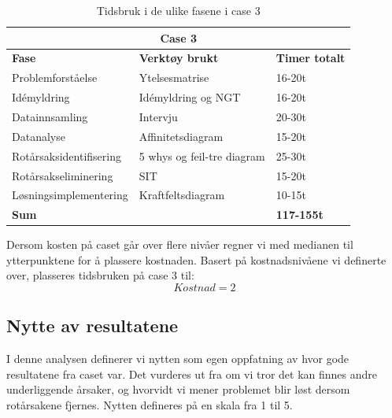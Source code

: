 \begin{table}[H]
  \centering
  \caption{Tidsbruk i de ulike fasene i case 3}
    \begin{tabular}{|lr|l|}
    \hline
    \multicolumn{3}{|c|}{\cellcolor{yellow}\textbf{Case 3}} \\
    \hline
    \multicolumn{1}{|l|}{\cellcolor{apricot}\textbf{Fase}} & \multicolumn{1}{l|}{\cellcolor{apricot}\textbf{Verktøy brukt}} & \cellcolor{apricot}\textbf{Timer totalt} \\
    \hline
    \multicolumn{1}{|l|}{Problemforståelse} & \multicolumn{1}{l|}{Ytelsesmatrise} & 16-20t \\
    \hline
    \multicolumn{1}{|l|}{Idémyldring} & \multicolumn{1}{l|}{Idémyldring og NGT} & 16-20t \\
    \hline
    \multicolumn{1}{|l|}{Datainnsamling} & \multicolumn{1}{l|}{Intervju} & 20-30t \\
    \hline
    \multicolumn{1}{|l|}{Datanalyse} & \multicolumn{1}{l|}{Affinitetsdiagram} & 15-20t \\
    \hline
    \multicolumn{1}{|l|}{Rotårsaksidentifisering} & \multicolumn{1}{l|}{5 whys og feil-tre diagram} & 25-30t \\
    \hline
    \multicolumn{1}{|l|}{Rotårsakseliminering} & \multicolumn{1}{l|}{SIT} & 15-20t \\
    \hline
    \multicolumn{1}{|l|}{Løsningsimplementering} & \multicolumn{1}{l|}{Kraftfeltsdiagram} & 10-15t \\
    \hline
    \multicolumn{2}{|l|}{\textbf{Sum}} & \textbf{117-155t} \\
    \hline
    \end{tabular}%
  \label{tab:tidsbruk_case3}%
\end{table}%

Dersom kosten på caset går over flere nivåer regner vi med medianen til ytterpunktene for å plassere kostnaden. Basert på kostnadsnivåene vi definerte over, plasseres tidsbruken på case 3 til:
\[Kostnad = 2\]

\subsection{Nytte av resultatene}
I denne analysen definerer vi nytten som egen oppfatning av hvor gode resultatene fra caset var. Det vurderes ut fra om vi tror det kan finnes andre underliggende årsaker, og hvorvidt vi mener problemet blir løst dersom rotårsakene fjernes. Nytten defineres på en skala fra 1 til 5. 

